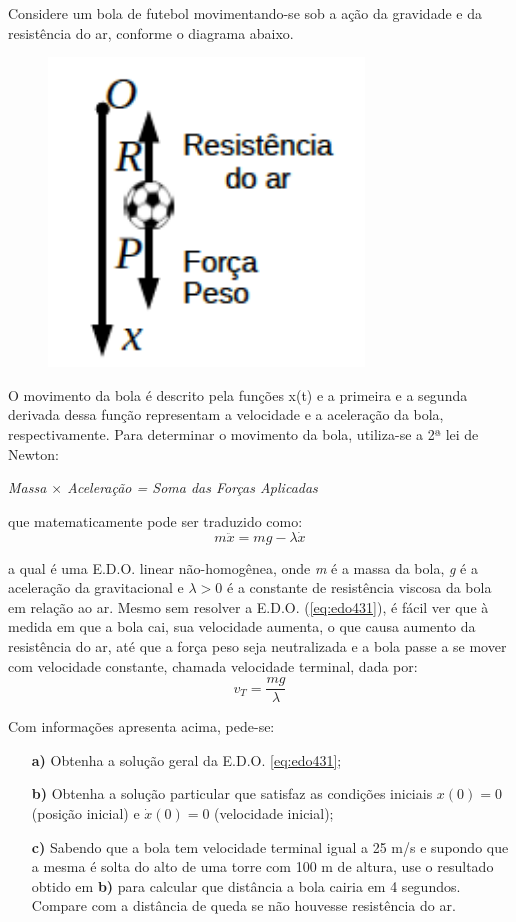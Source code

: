 \linespread{1.5}
Considere um bola de futebol movimentando-se sob a ação da gravidade e da resistência do ar, conforme o diagrama abaixo.

\begin{figure}[H]
    \centering
    \includegraphics[width = 0.3\linewidth]{fig/edo43.png}
\end{figure}

O movimento da bola é descrito pela funções x(t) e a primeira e a segunda derivada dessa função representam a velocidade e a aceleração da bola, respectivamente. Para determinar o movimento da bola, utiliza-se a 2ª lei de Newton:
\begin{center}
    \textit{Massa $\times$ Aceleração = Soma das Forças Aplicadas}
\end{center}

que matematicamente pode ser traduzido como:
\begin{equation}
    \label{eq:edo431}
    m\ddot{x} = mg - \lambda \dot{x}
\end{equation}

a qual é uma E.D.O. linear não-homogênea, onde \textit{m} é a massa da bola, \textit{g} é a aceleração da gravitacional e $\lambda>0$ é a constante de resistência viscosa da bola em relação ao ar. Mesmo sem resolver a E.D.O. (\ref{eq:edo431}), é fácil ver que à medida em que a bola cai, sua velocidade aumenta, o que causa aumento da resistência do ar, até que a força peso seja neutralizada e a bola passe a se mover com velocidade constante, chamada velocidade terminal, dada por:
\begin{equation}
    v_T = \frac{mg}{\lambda}
\end{equation}

Com informações apresenta acima, pede-se:
\begin{itemize}
    \item[\textbf{a)}] Obtenha a solução geral da E.D.O. \ref{eq:edo431};
    \item[\textbf{b)}] Obtenha a solução particular que satisfaz as condições iniciais $x(0) = 0$ (posição inicial) e $\dot{x}(0) = 0$ (velocidade inicial);
    \item[\textbf{c)}] Sabendo que a bola tem velocidade terminal igual a 25 m/s e supondo que a mesma é solta do alto de uma torre com 100 m de altura, use o resultado obtido em \textbf{b)} para calcular que distância a bola cairia em 4 segundos. Compare com a distância de queda se não houvesse resistência do ar.
\end{itemize}